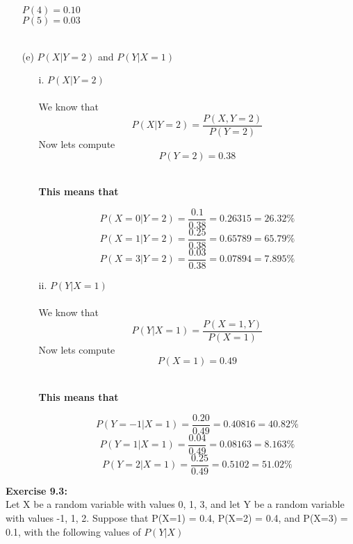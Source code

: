 \documentclass[11pt]{article}
\begin{document}
\begin{enumerate}
$P(4) = 0.10$\\
$P(5) = 0.03$\\\
\item[(e)] $P(X | Y = 2)$ and $P(Y | X = 1)$
\\
\begin{itemize}
\item[i. ]\textbf{$P(X | Y = 2)$}
\\ \\
We know that $$P(X | Y = 2) = \frac{P(X , Y = 2)}{P(Y = 2)}$$ 
Now lets compute
$$P(Y = 2) = 0.38$$ \\
\begin{center}
\textbf{This means that}
\end{center}
{\Large
$$P(X = 0 | Y = 2) = \frac{0.1}{0.38} = 0.26315 = 26.32\%$$
$$P(X = 1 | Y = 2) = \frac{0.25}{0.38} = 0.65789 = 65.79\%$$
$$P(X = 3 | Y = 2) = \frac{0.03}{0.38} = 0.07894 = 7.895\%$$
}
\item[ii. ] $P(Y | X = 1)$ \\ \\
  We know that $$P(Y | X = 1) = \frac{P(X = 1, Y)}{P(X = 1)}$$ 
Now lets compute
$$P(X = 1) = 0.49$$\\
\begin{center}
\textbf{This means that} \\
\end{center}
{\Large
$$P(Y = -1 | X = 1) = \frac{0.20}{0.49} = 0.40816 = 40.82\%$$
$$P(Y = 1 | X = 1) = \frac{0.04}{0.49} = 0.08163 = 8.163\%$$
$$P(Y = 2 | X = 1) = \frac{0.25}{0.49} = 0.5102 = 51.02\%$$
}
\end{itemize}
\end{enumerate}
\newpage
\textbf{Exercise 9.3: }\\
Let X be a random variable with values 0, 1, 3, and let Y be a random variable with values -1, 1, 2.  Suppose that P(X=1) = 0.4, P(X=2) = 0.4, and P(X=3) = 0.1, with the following values of $P(Y | X)$
\end{document}
